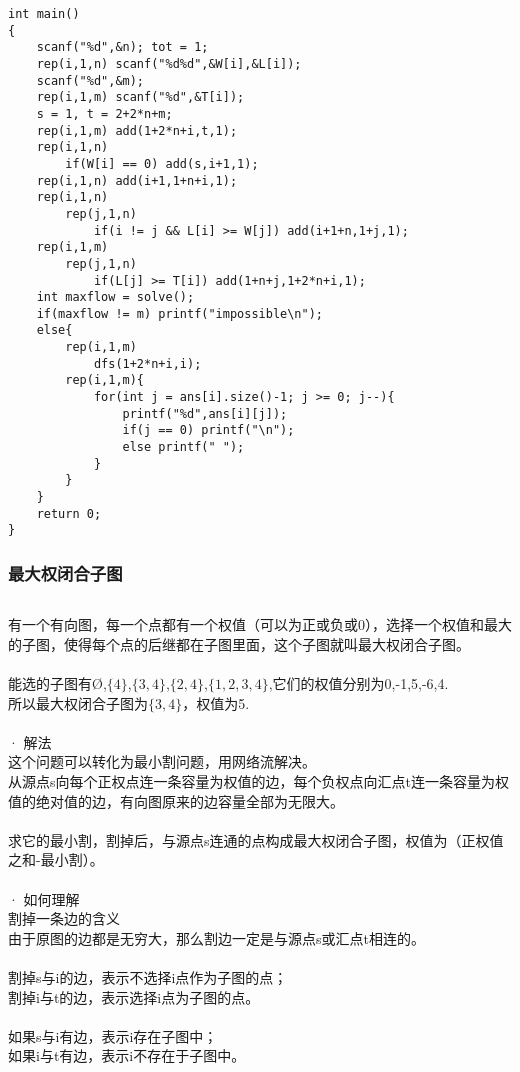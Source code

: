 \documentclass[twoside]{article}
\begin{document}
\begin{lstlisting}
int main()
{
	scanf("%d",&n); tot = 1;
	rep(i,1,n) scanf("%d%d",&W[i],&L[i]);
	scanf("%d",&m);
	rep(i,1,m) scanf("%d",&T[i]);
	s = 1, t = 2+2*n+m;
	rep(i,1,m) add(1+2*n+i,t,1);
	rep(i,1,n) 
		if(W[i] == 0) add(s,i+1,1);
	rep(i,1,n) add(i+1,1+n+i,1);
	rep(i,1,n)
		rep(j,1,n)
			if(i != j && L[i] >= W[j]) add(i+1+n,1+j,1);
	rep(i,1,m)
		rep(j,1,n)
			if(L[j] >= T[i]) add(1+n+j,1+2*n+i,1);
	int maxflow = solve();
	if(maxflow != m) printf("impossible\n");
	else{
		rep(i,1,m)
			dfs(1+2*n+i,i);
		rep(i,1,m){
			for(int j = ans[i].size()-1; j >= 0; j--){
				printf("%d",ans[i][j]);
				if(j == 0) printf("\n");
				else printf(" ");
			}
		}
	}
	return 0;
} \end{lstlisting}
\subsubsection{最大权闭合子图}
\begin{lstlisting}
\end{lstlisting}
有一个有向图，每一个点都有一个权值（可以为正或负或0），选择一个权值和最大的子图，使得每个点的后继都在子图里面，这个子图就叫最大权闭合子图。 \\
\\ 
能选的子图有Ø,$\{4\}$,$\{3,4\}$,$\{2,4\}$,$\{1,2,3,4\}$,它们的权值分别为0,-1,5,-6,4. \\
所以最大权闭合子图为$\{3,4\}$，权值为5.\\
\\
· 解法\\
这个问题可以转化为最小割问题，用网络流解决。 \\
从源点s向每个正权点连一条容量为权值的边，每个负权点向汇点t连一条容量为权值的绝对值的边，有向图原来的边容量全部为无限大。 \\
\\ 
求它的最小割，割掉后，与源点s连通的点构成最大权闭合子图，权值为（正权值之和-最小割）。\\
\\
· 如何理解\\
割掉一条边的含义\\
由于原图的边都是无穷大，那么割边一定是与源点s或汇点t相连的。\\
\\
割掉s与i的边，表示不选择i点作为子图的点； \\
割掉i与t的边，表示选择i点为子图的点。\\
\\
如果s与i有边，表示i存在子图中； \\
如果i与t有边，表示i不存在于子图中。\\
\end{document}
